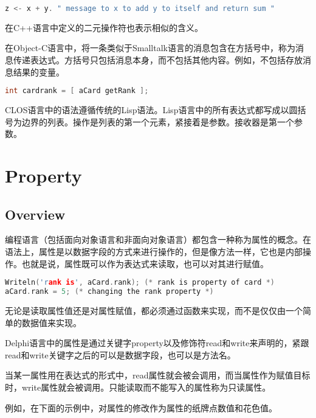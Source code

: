 \begin{lstlisting}[language=C++]
z <- x + y. " message to x to add y to itself and return sum "
\end{lstlisting}

在C++语言中定义的二元操作符也表示相似的含义。

在Object-C语言中，将一条类似于Smalltalk语言的消息包含在方括号中，称为消息传递表达式。方括号只包括消息本身，而不包括其他内容。例如，不包括存放消息结果的变量。


\begin{lstlisting}[language=C++]
int cardrank = [ aCard getRank ];
\end{lstlisting}


CLOS语言中的语法遵循传统的Lisp语法。Lisp语言中的所有表达式都写成以圆括号为边界的列表。操作是列表的第一个元素，紧接着是参数。接收器是第一个参数。



\chapter{Property}



\section{Overview}

编程语言（包括面向对象语言和非面向对象语言）都包含一种称为属性的概念。在语法上，属性是以数据字段的方式来进行操作的，但是像方法一样，它也是内部操作。也就是说，属性既可以作为表达式来读取，也可以对其进行赋值。




\begin{lstlisting}[language=C++]
Writeln('rank is', aCard.rank); (* rank is property of card *)
aCard.rank = 5; (* changing the rank property *)
\end{lstlisting}

无论是读取属性值还是对属性赋值，都必须通过函数来实现，而不是仅仅由一个简单的数据值来实现。

Delphi语言中的属性是通过关键字property以及修饰符read和write来声明的，紧跟read和write关键字之后的可以是数据字段，也可以是方法名。

当某一属性用在表达式的形式中，read属性就会被会调用，而当属性作为赋值目标时，write属性就会被调用。只能读取而不能写入的属性称为只读属性。

例如，在下面的示例中，对属性的修改作为属性的纸牌点数值和花色值。







